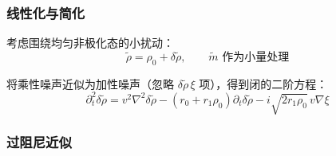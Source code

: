 \subsubsection{线性化与简化}

考虑围绕均匀非极化态的小扰动：
\begin{equation}\label{eq:linearization}
\tilde{\rho} = \rho_0 + \delta\tilde{\rho}, \qquad \tilde{m} \text{ 作为小量处理}
\end{equation}

将乘性噪声近似为加性噪声（忽略 $\delta\tilde{\rho}\,\xi$ 项），得到闭的二阶方程：
\begin{equation}\label{eq:second-order-eq}
\partial_t^2 \delta\tilde{\rho} = v^2\nabla^2\delta\tilde{\rho} - (r_0 + r_1\rho_0)\partial_t\delta\tilde{\rho} - i\sqrt{2r_1\rho_0}\,v\nabla\xi
\end{equation}

\subsubsection{过阻尼近似}


